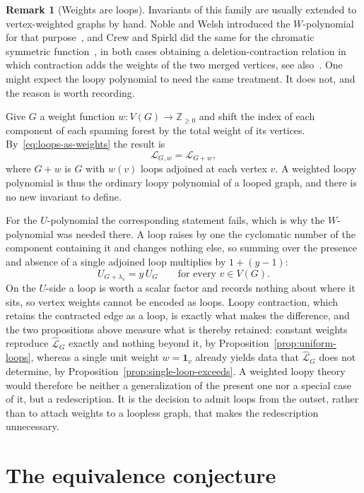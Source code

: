 \documentclass[11pt]{article}
\theoremstyle{plain}
\theoremstyle{definition}
\newtheorem{remark}[theorem]{Remark}
\renewcommand{\mathcal}{\mathscr}
\newcommand{\LL}{\mathcal{L}}    %
\newcommand{\bOne}{\mathbf{1}}
\newcommand{\ZZ}{\mathbb Z}
\numberwithin{equation}{section}
\begin{document}
\begin{remark}[Weights are loops]\label{rem:no-weighted-loopy}
Invariants of this family are usually extended to vertex-weighted graphs by
hand.  Noble and Welsh introduced the $W$-polynomial for that
purpose~\cite{NW,Nob}, and Crew and Spirkl did the same for the chromatic
symmetric function~\cite{CS2}, in both cases obtaining a
deletion-contraction relation in which contraction adds the weights of the
two merged vertices, see also~\cite{ACSZ}.  One might expect the loopy
polynomial to need the same treatment.  It does not, and the reason is
worth recording.

Give $G$ a weight function $w:V(G)\to\ZZ_{\ge 0}$ and shift the index of
each component of each spanning forest by the total weight of its vertices.
By~\eqref{eq:loops-as-weights} the result is
\[
   \LL_{G,w}=\LL_{G+w},
\]
where $G+w$ is $G$ with $w(v)$ loops adjoined at each vertex $v$.  A
weighted loopy polynomial is thus the ordinary loopy polynomial of a looped
graph, and there is no new invariant to define.

For the $U$-polynomial the corresponding statement fails, which is why the
$W$-polynomial was needed there.  A loop raises by one the cyclomatic number
of the component containing it and changes nothing else, so summing
over the presence and absence of a single adjoined loop multiplies
by $1+(y-1)$:
\[
   U_{G+\lambda_v}=y\,U_G
   \qquad\text{for every }v\in V(G).
\]
On the $U$-side a loop is worth a scalar factor and records nothing about
where it sits, so vertex weights cannot be encoded as loops.  Loopy
contraction, which retains the contracted edge as a loop, is exactly what
makes the difference, and the two propositions above measure what is thereby
retained: constant weights reproduce $\widehat{\LL}_G$ exactly and nothing
beyond it, by Proposition~\ref{prop:uniform-loops}, whereas a single unit
weight $w=\bOne_v$ already yields data that $\widehat{\LL}_G$ does not
determine, by Proposition~\ref{prop:single-loop-exceeds}.  A weighted loopy theory would therefore
be neither a generalization of the present one nor a special case of it,
but a redescription. It is the decision to admit
loops from the outset, rather than to attach weights to a loopless graph,
that makes the redescription unnecessary.
\end{remark}


\section{The equivalence conjecture}\label{sec:tutte-symmetric}
\end{document}
